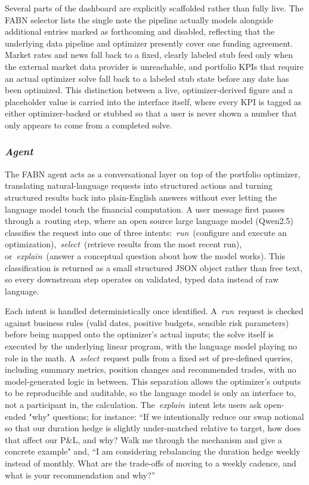 \documentclass[12pt]{article}
\begin{document}
Several parts of the dashboard are explicitly scaffolded rather than fully live. The FABN selector lists the single note the pipeline actually models alongside additional entries marked as forthcoming and disabled, reflecting that the underlying data pipeline and optimizer presently cover one funding agreement. Market rates and news fall back to a fixed, clearly labeled stub feed only when the external market data provider is unreachable, and portfolio KPIs that require an actual optimizer solve fall back to a labeled stub state before any date has been optimized. This distinction between a live, optimizer-derived figure and a placeholder value is carried into the interface itself, where every KPI is tagged as either optimizer-backed or stubbed so that a user is never shown a number that only appears to come from a completed solve.

\subsubsection{\textit{Agent }}

The FABN agent acts as a conversational layer on top of the portfolio optimizer, translating natural-language requests into structured actions and turning structured results back into plain-English answers without ever letting the language model touch the financial computation. A user message first passes through a routing step, where an open source large language model (Qwen2.5) classifies the request into one of three intents: \textit{run} (configure and execute an optimization), \textit{select} (retrieve results from the most recent run), or \textit{explain} (answer a conceptual question about how the model works). This classification is returned as a small structured JSON object rather than free text, so every downstream step operates on validated, typed data instead of raw language.

Each intent is handled deterministically once identified. A \textit{run} request is checked against business rules (valid dates, positive budgets, sensible risk parameters) before being mapped onto the optimizer's actual inputs; the solve itself is executed by the underlying linear program, with the language model playing no role in the math. A \textit{select} request pulls from a fixed set of pre-defined queries, including summary metrics, position changes and recommended trades, with no model-generated logic in between. This separation allows the optimizer's outputs to be reproducible and auditable, so the language model is only an interface to, not a participant in, the calculation. The \textit{explain} intent lets users ask open-ended "why" questions; for instance: “If we intentionally reduce our swap notional so that our duration hedge is slightly under-matched relative to target, how does that affect our P\&L, and why? Walk me through the mechanism and give a concrete example" and, “I am considering rebalancing the duration hedge weekly instead of monthly. What are the trade-offs of moving to a weekly cadence, and what is your recommendation and why?”
\end{document}
